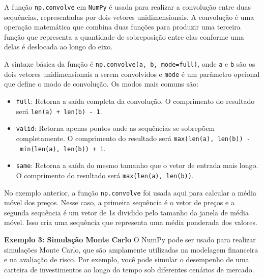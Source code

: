 \documentclass[
  portuguese,
  letterpaper,
  DIV=11,
  numbers=noendperiod]{scrreprt}
\providecommand{\tightlist}{%
  \setlength{\itemsep}{0pt}\setlength{\parskip}{0pt}}
\theoremstyle{definition}
\theoremstyle{remark}
\begin{document}
\begin{tcolorbox}[enhanced jigsaw, leftrule=.75mm, opacitybacktitle=0.6, colback=white, coltitle=black, colframe=quarto-callout-tip-color-frame, titlerule=0mm, left=2mm, opacityback=0, breakable, bottomtitle=1mm, toprule=.15mm, title=\textcolor{quarto-callout-tip-color}{\faLightbulb}\hspace{0.5em}{Dica}, colbacktitle=quarto-callout-tip-color!10!white, arc=.35mm, rightrule=.15mm, bottomrule=.15mm, toptitle=1mm]

A função \texttt{np.convolve} em \texttt{NumPy} é usada para realizar a
convolução entre duas sequências, representadas por dois vetores
unidimensionais. A convolução é uma operação matemática que combina duas
funções para produzir uma terceira função que representa a quantidade de
sobreposição entre elas conforme uma delas é deslocada ao longo do eixo.

A sintaxe básica da função é
\texttt{np.convolve(a,\ b,\ mode=\textquotesingle{}full\textquotesingle{})},
onde \texttt{a} e \texttt{b} são os dois vetores unidimensionais a serem
convolvidos e \texttt{mode} é um parâmetro opcional que define o modo de
convolução. Os modos mais comuns são:

\begin{itemize}
\tightlist
\item
  \texttt{\textquotesingle{}full\textquotesingle{}}: Retorna a saída
  completa da convolução. O comprimento do resultado será
  \texttt{len(a)\ +\ len(b)\ -\ 1}.
\item
  \texttt{\textquotesingle{}valid\textquotesingle{}}: Retorna apenas
  pontos onde as sequências se sobrepõem completamente. O comprimento do
  resultado será
  \texttt{max(len(a),\ len(b))\ -\ min(len(a),\ len(b))\ +\ 1}.
\item
  \texttt{\textquotesingle{}same\textquotesingle{}}: Retorna a saída do
  mesmo tamanho que o vetor de entrada mais longo. O comprimento do
  resultado será \texttt{max(len(a),\ len(b))}.
\end{itemize}

No exemplo anterior, a função \texttt{np.convolve} foi usada aqui para
calcular a média móvel dos preços. Nesse caso, a primeira sequência é o
vetor de preços e a segunda sequência é um vetor de 1s dividido pelo
tamanho da janela de média móvel. Isso cria uma sequência que representa
uma média ponderada dos valores.

\end{tcolorbox}

\textbf{Exemplo 3: Simulação Monte Carlo} O NumPy pode ser usado para
realizar simulações Monte Carlo, que são amplamente utilizadas na
modelagem financeira e na avaliação de risco. Por exemplo, você pode
simular o desempenho de uma carteira de investimentos ao longo do tempo
sob diferentes cenários de mercado.
\end{document}
